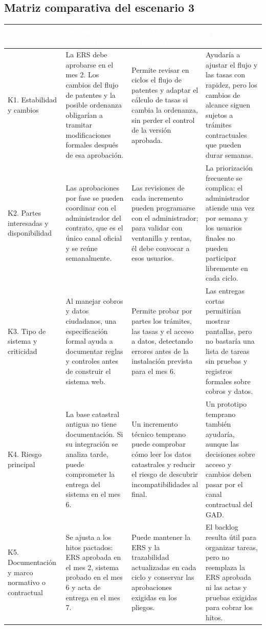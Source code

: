 \subsection{Matriz comparativa del escenario 3}

\begin{center}
\small
\begin{tabularx}{\textwidth}{|>{\raggedright\arraybackslash}p{2.6cm}|L|L|L|}
\hline
{}
\textcolor{white}{\textbf{Criterio}} &
\textcolor{white}{\textbf{Secuencial (cascada)}} &
\textcolor{white}{\textbf{Iterativo e incremental}} &
\textcolor{white}{\textbf{Ágil}} \\ \hline
K1. Estabilidad y cambios &
La ERS debe aprobarse en el mes 2. Los cambios del flujo de patentes y la posible ordenanza obligarían a tramitar modificaciones formales después de esa aprobación. &
Permite revisar en ciclos el flujo de patentes y adaptar el cálculo de tasas si cambia la ordenanza, sin perder el control de la versión aprobada. &
Ayudaría a ajustar el flujo y las tasas con rapidez, pero los cambios de alcance siguen sujetos a trámites contractuales que pueden durar semanas. \\ \hline
K2. Partes interesadas y disponibilidad &
Las aprobaciones por fase se pueden coordinar con el administrador del contrato, que es el único canal oficial y se reúne semanalmente. &
Las revisiones de cada incremento pueden programarse con el administrador; para validar con ventanilla y rentas, él debe convocar a esos usuarios. &
La priorización frecuente se complica: el administrador atiende una vez por semana y los usuarios finales no pueden participar libremente en cada ciclo. \\ \hline
K3. Tipo de sistema y criticidad &
Al manejar cobros y datos ciudadanos, una especificación formal ayuda a documentar reglas y controles antes de construir el sistema web. &
Permite probar por partes los trámites, las tasas y el acceso a datos, detectando errores antes de la instalación prevista para el mes 6. &
Las entregas cortas permitirían mostrar pantallas, pero no bastaría una lista de tareas sin pruebas y registros formales sobre cobros y datos. \\ \hline
K4. Riesgo principal &
La base catastral antigua no tiene documentación. Si su integración se analiza tarde, puede comprometer la entrega del sistema en el mes 6. &
Un incremento técnico temprano puede comprobar cómo leer los datos catastrales y reducir el riesgo de descubrir incompatibilidades al final. &
Un prototipo temprano también ayudaría, aunque las decisiones sobre acceso y cambios deben pasar por el canal contractual del GAD. \\ \hline
K5. Documentación y marco normativo o contractual &
Se ajusta a los hitos pactados: ERS aprobada en el mes 2, sistema probado en el mes 6 y acta de entrega en el mes 7. &
Puede mantener la ERS y la trazabilidad actualizadas en cada ciclo y conservar las aprobaciones exigidas en los pliegos. &
El backlog resulta útil para organizar tareas, pero no reemplaza la ERS aprobada ni las actas y pruebas exigidas para cobrar los hitos. \\ \hline
\end{tabularx}
\end{center}

